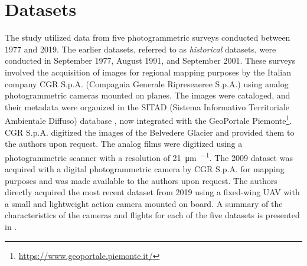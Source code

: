 

\section{Datasets}\label{sec:2:datasets}

The study utilized data from five photogrammetric surveys conducted between 1977 and 2019. The earlier datasets, referred to as \textit{historical} datasets, were conducted in September 1977, August 1991, and September 2001. 
These surveys involved the acquisition of images for regional mapping purposes by the Italian company CGR S.p.A. (Compagnia Generale Ripreseaeree S.p.A.) using analog photogrammetric cameras mounted on planes. 
The images were cataloged, and their metadata were organized in the SITAD (Sistema Informativo Territoriale Ambientale Diffuso) database \citep{Cipriano2005_SITAD}, now integrated with the GeoPortale Piemonte\footnote{\url{ https://www.geoportale.piemonte.it/}}.
CGR S.p.A. digitized the images of the Belvedere Glacier and provided them to the authors upon request. 
The analog films were digitized using a photogrammetric scanner with a resolution of \SI{21}{\micro\meter\per\pixel}. 
The 2009 dataset was acquired with a digital photogrammetric camera by CGR S.p.A. for mapping purposes and was made available to the authors upon request.
The authors directly acquired the most recent dataset from 2019 using a fixed-wing UAV with a small and lightweight action camera mounted on board.
A summary of the characteristics of the cameras and flights for each of the five datasets is presented in .

